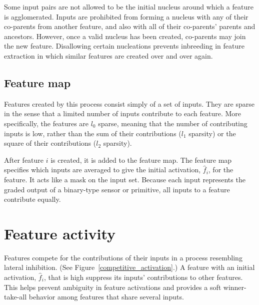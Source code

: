 Some input pairs are not allowed to be the initial nucleus around which a feature is agglomerated. Inputs are prohibited from forming a nucleus with any of their co-parents from another feature, and also with all of their co-parents' parents and ancestors. However, once a valid nucleus has been created, co-parents may join the new feature. Disallowing certain nucleations prevents inbreeding in feature extraction in which similar features are created over and over again. 

\subsection{Feature map}

Features created by this process consist simply of a set of inputs. They are sparse in the sense that a limited number of inputs contribute to each feature. More specifically, the features are $l_0$ sparse, meaning that the number of contributing inputs is low, rather than the sum of their contributions ($l_1$ sparsity) or the square of their contributions ($l_2$ sparsity).

After feature $i$ is created, it is added to the feature map. The feature map specifies which inputs are averaged to give the initial activation, $\hat{f}_i$, for the feature. It acts like a mask on the input set. Because each input represents the graded output of a binary-type sensor or primitive, all inputs to a feature contribute equally.

\section{Feature activity}

Features compete for the contributions of their inputs in a process resembling lateral inhibition. (See Figure~\ref{competitive_activation}.) A feature with an initial activation, $\hat{f}_i$, that is high suppress its inputs' contributions to other features. This helps prevent ambiguity in feature activations and provides a soft winner-take-all behavior among features that share several inputs.

